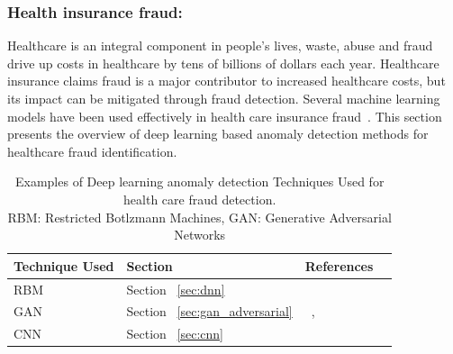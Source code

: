 \subsubsection{Health insurance fraud:}

Healthcare is an integral component in people's lives, waste, abuse and fraud drive up costs in healthcare by tens of billions of dollars each year. Healthcare insurance claims fraud is a major contributor to increased healthcare costs, but its impact can be mitigated through fraud detection. Several machine learning models have been used effectively in health care insurance fraud~\cite{bauder2017medicare}.
This section presents the overview of deep learning based anomaly detection methods for healthcare fraud identification.
\begin{table}
\begin{center}
  \caption{Examples of Deep learning anomaly detection Techniques Used for health care fraud detection.
          \\RBM: Restricted Botlzmann Machines, GAN: Generative Adversarial Networks}
  \label{tab:healthcarefraudDetect}
    \begin{tabular}{ | l | p{2cm} | l | p{5cm} |}
    \hline
    Technique Used & Section & References \\ \hline
     RBM & Section ~\ref{sec:dnn} & ~\cite{lasaga2018deep} \\\hline
     GAN & Section ~\ref{sec:gan_adversarial} & ~\cite{ghasedi2018semi},~\cite{finlayson2018adversarial}\\\hline
     CNN  & Section ~\ref{sec:cnn} & ~\cite{esteva2017dermatologist}\\\hline
    \end{tabular}
\end{center}
\end{table}

